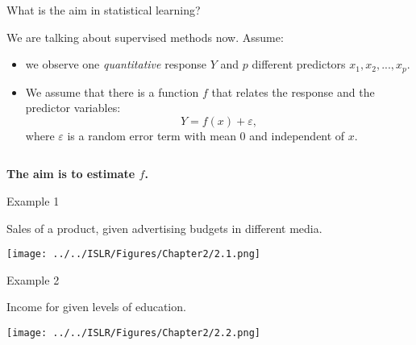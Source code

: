 \documentclass[ignorenonframetext,]{beamer}
\providecommand{\tightlist}{%
  \setlength{\itemsep}{0pt}\setlength{\parskip}{0pt}}
\begin{document}
\begin{frame}

\begin{block}{What is the aim in statistical learning?}

\vspace{3mm}

We are talking about supervised methods now. Assume:

\vspace{2mm}

\begin{itemize}
\tightlist
\item
  we observe one \emph{quantitative} response \(Y\) and \(p\) different
  predictors \(x_1, x_2,... , x_p\).
\end{itemize}

\vspace{1mm}

\begin{itemize}
\tightlist
\item
  We assume that there is a function \(f\) that relates the response and
  the predictor variables: \[ Y = f(x) + \varepsilon,\] where
  \(\varepsilon\) is a random error term with mean 0 and independent of
  \(x\).
\end{itemize}

\(~\)

\centering
{\bf The aim is to estimate $f$.}

\end{block}

\end{frame}

\begin{frame}{Example 1}
\protect\hypertarget{example-1}{}

Sales of a product, given advertising budgets in different media.

\texttt{[image: ../../ISLR/Figures/Chapter2/2.1.png]}

\end{frame}

\begin{frame}{Example 2}
\protect\hypertarget{example-2}{}

\vspace{4mm}

Income for given levels of education.

\texttt{[image: ../../ISLR/Figures/Chapter2/2.2.png]}

\end{frame}
\end{document}
